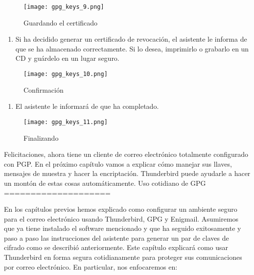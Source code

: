 \documentclass[10pt,a5paper,twoside,,]{book}
\providecommand{\tightlist}{%
  \setlength{\itemsep}{0pt}\setlength{\parskip}{0pt}}
\begin{document}
\begin{figure}[htbp]
\centering
\texttt{[image: gpg\_keys\_9.png]}
\caption{Guardando el certificado}
\end{figure}

\begin{enumerate}
\def\labelenumi{\arabic{enumi}.}
\setcounter{enumi}{9}
\tightlist
\item
  Si ha decidido generar un certificado de revocación, el asistente le
  informa de que se ha almacenado correctamente. Si lo desea, imprimirlo
  o grabarlo en un CD y guárdelo en un lugar seguro.
\end{enumerate}

\begin{figure}[htbp]
\centering
\texttt{[image: gpg\_keys\_10.png]}
\caption{Confirmación}
\end{figure}

\begin{enumerate}
\def\labelenumi{\arabic{enumi}.}
\setcounter{enumi}{10}
\tightlist
\item
  El asistente le informará de que ha completado.
\end{enumerate}

\begin{figure}[htbp]
\centering
\texttt{[image: gpg\_keys\_11.png]}
\caption{Finalizando}
\end{figure}

Felicitaciones, ahora tiene un cliente de correo electrónico totalmente
configurado con PGP. En el próximo capítulo vamos a explicar cómo
manejar sus llaves, mensajes de muestra y hacer la encriptación.
Thunderbird puede ayudarle a hacer un montón de estas cosas
automáticamente. Uso cotidiano de GPG ====================

En los capítulos previos hemos explicado como configurar un ambiente
seguro para el correo electrónico usando Thunderbird, GPG y Enigmail.
Asumiremos que ya tiene instalado el software mencionado y que ha
seguido exitosamente y paso a paso las instrucciones del asistente para
generar un par de claves de cifrado como se describió anteriormente.
Este capítulo explicará como usar Thunderbird en forma segura
cotidianamente para proteger sus comunicaciones por correo electrónico.
En particular, nos enfocaremos en:
\end{document}
